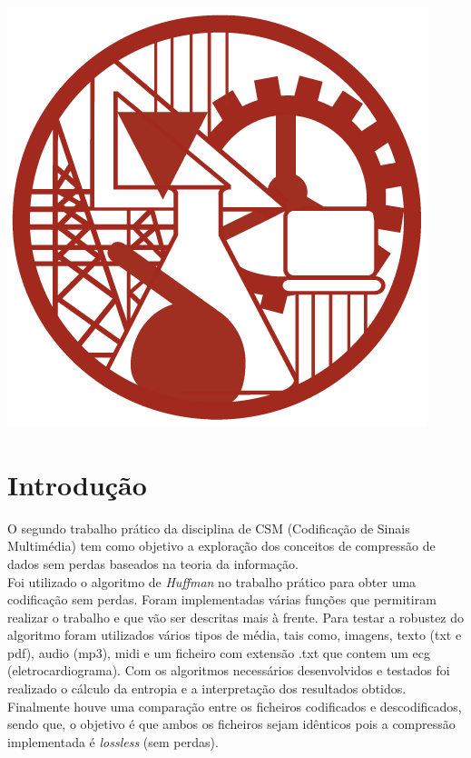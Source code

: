 \documentclass[12pt,a4paper]{article}
\begin{document}
\begin{titlepage}
\includegraphics[scale=0.3]{iselLogo.jpg}\\[1cm]
 
\vfill %
\end{titlepage}

\tableofcontents
\newpage
\listoffigures
\listoftables
\newpage
\section{Introdução}
O segundo trabalho prático da disciplina de CSM (Codificação de Sinais Multimédia) tem como objetivo a exploração dos conceitos de compressão de dados sem perdas baseados na teoria da informação.\\ Foi utilizado o algoritmo de \textit{Huffman} no trabalho prático para obter uma codificação sem perdas. Foram implementadas várias funções que permitiram realizar o trabalho e que vão ser descritas mais à frente. Para testar a robustez do algoritmo foram utilizados vários tipos de média, tais como, imagens, texto (txt e pdf), audio (mp3), midi e um ficheiro com extensão .txt que contem um ecg (eletrocardiograma). Com os algoritmos necessários desenvolvidos e testados foi realizado o cálculo da entropia e a interpretação dos resultados obtidos.\\ Finalmente houve uma comparação entre os ficheiros codificados e descodificados, sendo que, o objetivo é que ambos os ficheiros sejam idênticos pois a compressão implementada é \textit{lossless} (sem perdas).
\newpage
\end{document}
